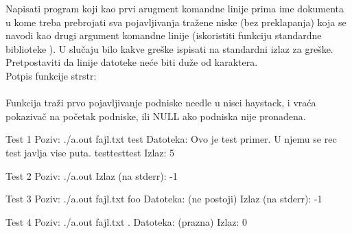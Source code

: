 \begin{Exercise}[label=904]

 Napisati program koji kao prvi arugment komandne linije prima ime dokumenta u kome treba prebrojati sva pojavljivanja tražene niske (bez preklapanja) koja se navodi kao drugi argument komandne linije (iskoristiti funkciju standardne biblioteke ). U slučaju
  bilo kakve greške ispisati  na standardni izlaz za greške.
  Pretpostaviti da linije datoteke neće biti duže od 
  karaktera.\\
  Potpis funkcije strstr:\\
  \\
  Funkcija traži prvo pojavljivanje podniske needle u nisci
  haystack, i vraća pokazivač na početak podniske, ili
  NULL ako podniska nije pronađena.

\begin{miditest}
\begin{test}{Test 1}
Poziv:  ./a.out fajl.txt test          
Datoteka:   Ovo je test primer.     
        U njemu se rec test javlja
        vise puta. testtesttest
Izlaz:  5                       
\end{test}
\end{miditest}
\begin{miditest}
\begin{test}{Test 2}
Poziv:   ./a.out      
Izlaz  (na stderr):  -1       
\end{test}
\end{miditest}


\begin{miditest}
\begin{test}{Test 3}
Poziv:   ./a.out fajl.txt foo
Datoteka:   (ne postoji)      
Izlaz (na stderr):    -1              
\end{test}
\end{miditest}
\begin{miditest}
\begin{test}{Test 4}
Poziv:  ./a.out fajl.txt .    
Datoteka:   (prazna)      
Izlaz:    0              
\end{test}
\end{miditest}

\end{Exercise}
\begin{Answer}[ref=904]
\end{Answer}


